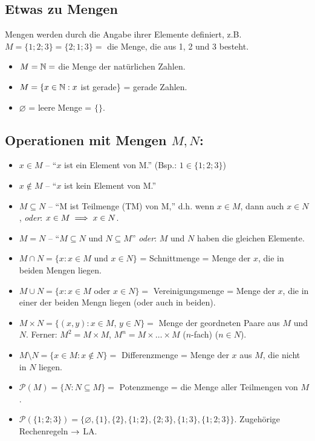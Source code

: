 \documentclass[12pt]{scrreprt}
\begin{document}
\subsection*{Etwas zu Mengen}
Mengen werden durch die Angabe ihrer Elemente definiert, z.B. $M = \{1; 2; 3\} = \{2; 1; 3\} =$ die Menge, die aus 1, 2 und 3 besteht.
\begin{itemize}
\item $M = \mathbb{N} =$ die Menge der natürlichen Zahlen.
\item $M = \{x\in\mathbb{N}: x$ ist gerade\} = gerade Zahlen.
\item $\varnothing$ = leere Menge = $\{\}$.
\end{itemize}

\subsection*{Operationen mit Mengen $M, N$:}
\begin{itemize}
\item $x \in M$ -- "`$x$ ist ein Element von M."' (Bsp.: $1 \in \{1; 2; 3\}$)
\item $x \notin M$ -- "`$x$ ist kein Element von M."'
\item $M \subseteq N$ -- "`M ist Teilmenge (TM) von M,"' d.h. wenn $x \in M$, dann auch $x \in N$, \textit{oder}: $x \in M \implies x \in N$.
\item $M = N$ -- "`$M \subseteq N$ und $N \subseteq M$"' \textit{oder}: $M$ und $N$ haben die gleichen Elemente.
\item $M \cap N = \{x: x \in M$ und $x \in N\}$ = Schnittmenge = Menge der $x$, die in beiden Mengen liegen.
\item $M \cup N = \{x: x \in M$ oder $x \in N\} =$ Vereinigungsmenge = Menge der $x$, die in einer der beiden Mengn liegen (oder auch in beiden).
\item $M \times N = \{(x,y): x \in M$, $y \in N\} =$ Menge der geordneten Paare aus $M$ und $N$. Ferner: $M^2 = M \times M$, $M^n = M \times \ldots \times M$ ($n$-fach) ($n \in N$).
\item $M \setminus N = \{x \in M: x \notin N\} =$ Differenzmenge = Menge der $x$ aus $M$, die nicht in $N$ liegen.
\item $\mathcal{P}(M) = \{N: N \subseteq M\} =$ Potenzmenge = die Menge aller Teilmengen von $M$.
\item $\mathcal{P}(\{1; 2; 3\}) = \{\varnothing, \{1\}, \{2\}, \{1; 2\}, \{2; 3\}, \{1; 3\}, \{1; 2; 3\}\}$. Zugehörige Rechenregeln $\rightarrow$ LA.
\end{itemize}
\end{document}
